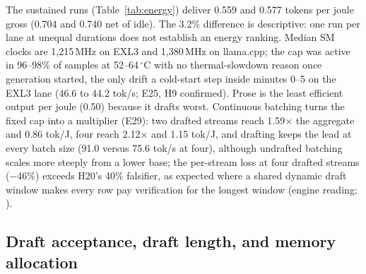 \documentclass[11pt]{article}
\begin{document}
The sustained runs (Table~\ref{tab:energy}) deliver 0.559 and 0.577 tokens
per joule gross (0.704 and 0.740 net of idle). The 3.2\% difference is
descriptive: one run per lane at unequal durations does not establish an
energy ranking. Median SM clocks are 1,215\,MHz on EXL3 and 1,380\,MHz on
llama.cpp;
the cap was active in 96--98\% of samples at 52--64\,$^\circ$C with no
thermal-slowdown reason once generation started, the only drift a cold-start
step inside minutes 0--5 on the EXL3 lane (46.6 to 44.2 tok/s; E25, H9
confirmed). Prose is the least efficient output per joule (0.50) because it
drafts worst. Continuous batching turns the fixed cap into a multiplier
(E29): two drafted streams reach 1.59$\times$ the aggregate and 0.86 tok/J,
four reach 2.12$\times$ and 1.15 tok/J, and drafting keeps the lead at every
batch size (91.0 versus 75.6 tok/s at four), although undrafted batching
scales more steeply from a lower base; the per-stream loss at four drafted
streams ($-46\%$) exceeds H20's 40\% falsifier, as expected where a shared
dynamic draft window makes every row pay verification for the longest window
(engine reading; \citealp{su2023synergy}).

\subsection{Draft acceptance, draft length, and memory allocation}
\label{sec:drafting}
\end{document}
